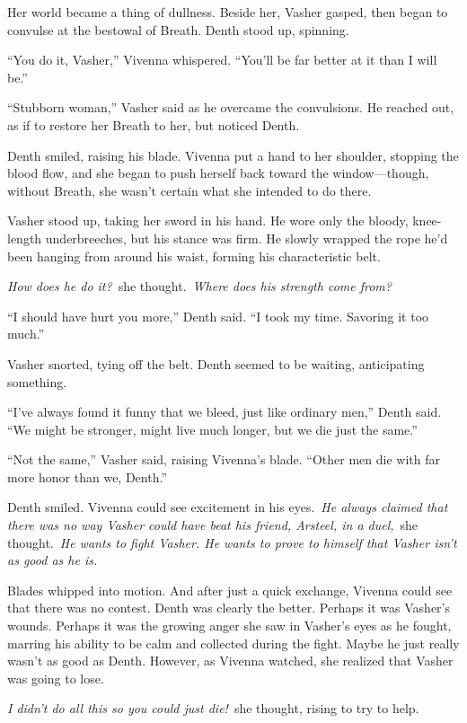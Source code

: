 Her world became a thing of dullness. Beside her, Vasher gasped, then began to convulse at the bestowal of Breath. Denth stood up, spinning.

“You do it, Vasher,” Vivenna whispered. “You’ll be far better at it than I will be.”

“Stubborn woman,” Vasher said as he overcame the convulsions. He reached out, as if to restore her Breath to her, but noticed Denth.

Denth smiled, raising his blade. Vivenna put a hand to her shoulder, stopping the blood flow, and she began to push herself back toward the window—though, without Breath, she wasn’t certain what she intended to do there.

Vasher stood up, taking her sword in his hand. He wore only the bloody, knee-length underbreeches, but his stance was firm. He slowly wrapped the rope he’d been hanging from around his waist, forming his characteristic belt.

\textit{How does he do it?}~she thought.~\textit{Where does his strength come from?}

“I should have hurt you more,” Denth said. “I took my time. Savoring it too much.”

Vasher snorted, tying off the belt. Denth seemed to be waiting, anticipating something.

“I’ve always found it funny that we bleed, just like ordinary men,” Denth said. “We might be stronger, might live much longer, but we die just the same.”

“Not the same,” Vasher said, raising Vivenna’s blade. “Other men die with far more honor than we, Denth.”

Denth smiled. Vivenna could see excitement in his eyes.~\textit{He always claimed that there was no way Vasher could have beat his friend, Arsteel, in a duel,}~she thought.~\textit{He wants to fight Vasher. He wants to prove to himself that Vasher isn’t as good as he is.}

Blades whipped into motion. And after just a quick exchange, Vivenna could see that there was no contest. Denth was clearly the better. Perhaps it was Vasher’s wounds. Perhaps it was the growing anger she saw in Vasher’s eyes as he fought, marring his ability to be calm and collected during the fight. Maybe he just really wasn’t as good as Denth. However, as Vivenna watched, she realized that Vasher was going to lose.

\textit{I didn’t do all this so you could just die!}~she thought, rising to try to help.

